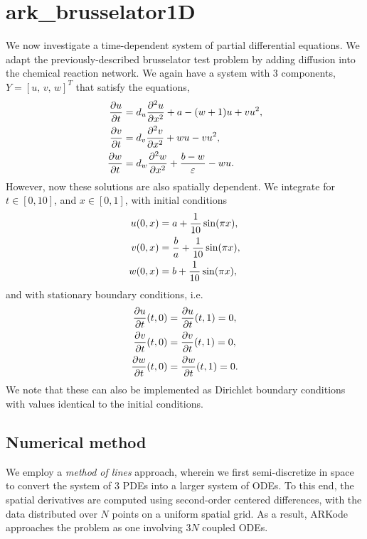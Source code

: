\documentclass[letterpaper,10pt,english]{sphinxmanual}
\begin{document}
\section{ark\_brusselator1D}
\label{c_serial:id18}\label{c_serial:ark-brusselator1d}
We now investigate a time-dependent system of partial differential
equations.  We adapt the previously-described brusselator test problem
by adding diffusion into the chemical reaction network.  We again have
a system with 3 components, \(Y = [u,\, v,\, w]^T\) that satisfy
the equations,
\begin{gather}
\begin{split}\frac{\partial u}{\partial t} &= d_u \frac{\partial^2 u}{\partial
   x^2} + a - (w+1) u + v u^2, \\
\frac{\partial v}{\partial t} &= d_v \frac{\partial^2 v}{\partial
   x^2} + w u - v u^2, \\
\frac{\partial w}{\partial t} &= d_w \frac{\partial^2 w}{\partial
   x^2} + \frac{b-w}{\varepsilon} - w u.\end{split}\notag
\end{gather}
However, now these solutions are also spatially dependent.  We
integrate for \(t \in [0, 10]\), and \(x \in [0, 1]\), with
initial conditions
\begin{gather}
\begin{split}u(0,x) &=  a + \frac{1}{10} \sin(\pi x),\\
v(0,x) &= \frac{b}{a} + \frac{1}{10}\sin(\pi x),\\
w(0,x) &=  b + \frac{1}{10}\sin(\pi x),\end{split}\notag
\end{gather}
and with stationary boundary conditions, i.e.
\begin{gather}
\begin{split}\frac{\partial u}{\partial t}(t,0) &= \frac{\partial u}{\partial t}(t,1) = 0,\\
\frac{\partial v}{\partial t}(t,0) &= \frac{\partial v}{\partial t}(t,1) = 0,\\
\frac{\partial w}{\partial t}(t,0) &= \frac{\partial w}{\partial t}(t,1) = 0.\end{split}\notag
\end{gather}
We note that these can also be implemented as Dirichlet boundary
conditions with values identical to the initial conditions.


\subsection{Numerical method}
\label{c_serial:id19}
We employ a \emph{method of lines} approach, wherein we first
semi-discretize in space to convert the system of 3 PDEs into a larger
system of ODEs.  To this end, the spatial derivatives are computed
using second-order centered differences, with the data distributed
over \(N\) points on a uniform spatial grid.  As a result, ARKode
approaches the problem as one involving \(3N\) coupled ODEs.
\end{document}
